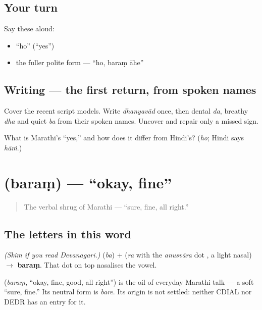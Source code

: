 \subsection*{Your turn}
Say these aloud:

\begin{itemize}
\raggedright
  \item \textquotedblleft{}ho\textquotedblright{} (\textquotedblleft{}yes\textquotedblright{})
  \item the fuller polite form — \textquotedblleft{}ho, baraṃ āhe\textquotedblright{}
\end{itemize}

\subsection*{Writing — the first return, from spoken names}
Cover the recent script models. Write \emph{dhanyavād} once, then dental \emph{da}, breathy \emph{dha} and quiet \emph{ba} from their spoken names. Uncover and repair only a missed sign.

\begin{tcolorbox}[breakable,colback=teal!4,colframe=teal!35!black,title={Before you move on}]
What is Marathi's \textquotedblleft{}yes,\textquotedblright{} and how does it differ from Hindi's? (\emph{ho}; Hindi says \emph{hāṁ}.)
\end{tcolorbox}
\section[\texorpdfstring{\mr{बरं} (baram)}{बरं (baram)}]{ (baraṃ) — \textquotedblleft{}okay, fine\textquotedblright{}}

\label{lesson:MR-C01-baram}



\begin{quote}
The verbal shrug of Marathi — \textquotedblleft{}sure, fine, all right.\textquotedblright{}
\end{quote}

\subsection*{The letters in this word}
\emph{(Skim if you read Devanagari.)} \textbf{} (\emph{ba}) + \textbf{} (\emph{ra} with the \emph{anusvāra} dot \textbf{}, a light nasal) $\to$ \textbf{baraṃ}. That dot on top nasalises the vowel.

\begin{cousinweb}
\textbf{} (\emph{baraṃ}, \textquotedblleft{}okay, fine, good, all right\textquotedblright{}) is the oil of everyday Marathi talk — a soft \textquotedblleft{}sure, fine.\textquotedblright{} Its neutral form is \emph{bare}. Its origin is not settled: neither CDIAL nor DEDR has an entry for it.
\end{cousinweb}


